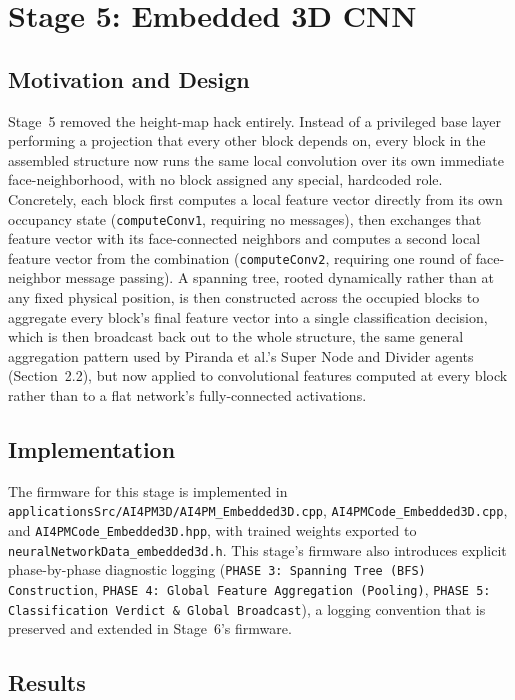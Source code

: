 \documentclass[12pt,a4paper]{report}
\begin{document}
\section{Stage 5: Embedded 3D CNN}
\label{sec:stage5}

\subsection*{Motivation and Design}

Stage~5 removed the height-map hack entirely. Instead of a privileged base layer performing a projection that every other block depends on, every block in the assembled structure now runs the same local convolution over its own immediate face-neighborhood, with no block assigned any special, hardcoded role. Concretely, each block first computes a local feature vector directly from its own occupancy state (\texttt{computeConv1}, requiring no messages), then exchanges that feature vector with its face-connected neighbors and computes a second local feature vector from the combination (\texttt{computeConv2}, requiring one round of face-neighbor message passing). A spanning tree, rooted dynamically rather than at any fixed physical position, is then constructed across the occupied blocks to aggregate every block's final feature vector into a single classification decision, which is then broadcast back out to the whole structure, the same general aggregation pattern used by Piranda et al.'s Super Node and Divider agents (Section~2.2), but now applied to convolutional features computed at every block rather than to a flat network's fully-connected activations.

\subsection*{Implementation}

The firmware for this stage is implemented in \texttt{applicationsSrc/AI4PM3D/AI4PM\_Embedded3D.cpp}, \texttt{AI4PMCode\_Embedded3D.cpp}, and \texttt{AI4PMCode\_Embedded3D.hpp}, with trained weights exported to \texttt{neuralNetworkData\_embedded3d.h}. This stage's firmware also introduces explicit phase-by-phase diagnostic logging (\texttt{PHASE 3: Spanning Tree (BFS) Construction}, \texttt{PHASE 4: Global Feature Aggregation (Pooling)}, \texttt{PHASE 5: Classification Verdict \& Global Broadcast}), a logging convention that is preserved and extended in Stage~6's firmware.

\subsection*{Results}
\end{document}

